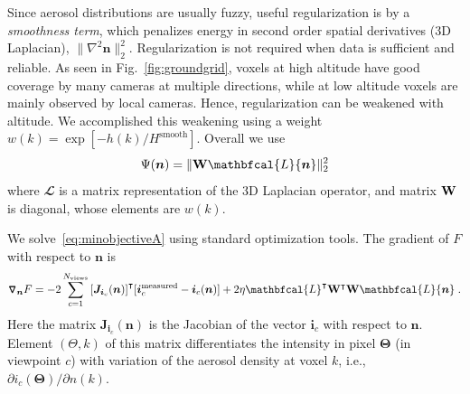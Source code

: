 \documentclass[10pt,letterpaper]{article}
\newcommand{\Grad}[1]{\bm{\triangledown_{#1}}}
\newcommand{\transpose}[1]{{#1}^\intercal}
\newcommand{\Laplacian}{\mathbfcal{L}}
\begin{document}
Since aerosol distributions are usually fuzzy, useful regularization
is by a {\em smoothness term}, which penalizes energy in second order
spatial derivatives (3D Laplacian), $\| \nabla^2{\bm
  n}\|^2_2$. Regularization is not required when data is sufficient
and reliable. As seen in Fig.~\ref{fig:groundgrid}, voxels at high
altitude have good coverage by many cameras at multiple directions,
while at low altitude voxels are mainly observed by local
cameras. Hence, regularization can be weakened with altitude. We
accomplished this weakening using a weight
$w(k)=\exp\left[-h(k)/H^\mathrm{smooth}\right]$.  Overall we use
\begin{equation}
  \label{eq:regularizer}
  \Psi({\bm n}) = \| {\bf W} \Laplacian{\bm n}\|^2_2
\end{equation}
where $\Laplacian$ is a matrix representation of the 3D Laplacian
operator, and matrix ${\bf W}$ is diagonal, whose elements are $w(k)$.

We solve~\cref{eq:minobjectiveA} using standard optimization tools.
The gradient of $F$ with respect to ${\bm n}$ is
\begin{align}
  \Grad{{\bm n}} F = -2\sum_{c=1}^{N_{\rm views}}
  \transpose{\left[{\bm J}_{{\bm i}_c}({\bm n})\right]} [{\bm i}^{\rm
    measured}_c - {\bm i}_c({\bm n})] + 2 \eta
  \transpose{\Laplacian}\transpose{{\bf W}}{\bf W}\Laplacian{\bm n}
  \;.
  \label{eq:gradient1}
\end{align}
Here the matrix ${\bm J}_{{\bm i}_c}({\bm n})$ is the Jacobian of the
vector ${\bm i}_c$ with respect to ${\bm n}$.  Element $(\Theta,k)$ of
this matrix differentiates the intensity in pixel ${\bm \Theta}$ (in
viewpoint $c$) with variation of the aerosol density at voxel $k$,
i.e., $\partial i_c({\bm \Theta})/\partial{n(k)}$.
\end{document}
